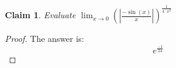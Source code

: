 \documentclass{article}
\newtheorem{theorem}{Claim}
\begin{document}
\begin{theorem}
Evaluate
$ \lim_{x \to 0}\left( \left| \frac{ -\sin(x) }{ x } \right| \right)^{\frac{ 1 }{ 4 \cdot x^2 }} $
\end{theorem}

\begin{proof}
The answer is:
\[
e^{\frac{-1}{24}}
\]
\end{proof}
\end{document}
